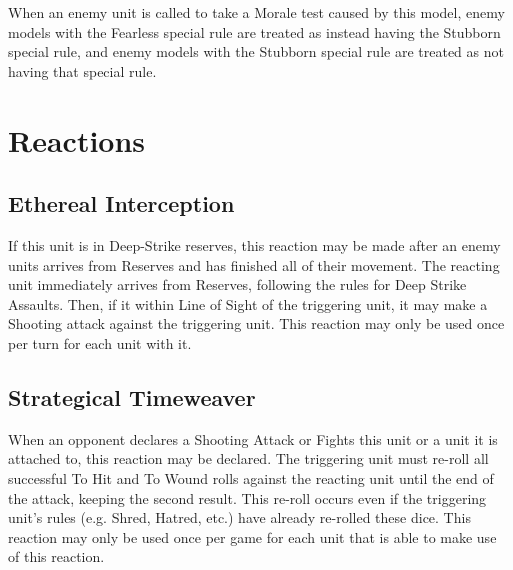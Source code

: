 When an enemy unit is called to take a Morale test caused by this model, enemy models with the Fearless special rule are treated as instead having the Stubborn special rule, and enemy models with the Stubborn special rule are treated as not having that special rule.

\section{Reactions}

\subsection{Ethereal Interception} \label{Ethereal Interception}

If this unit is in Deep-Strike reserves, this reaction may be made after an enemy units arrives from Reserves and has finished all of their movement. The reacting unit immediately arrives from Reserves, following the rules for Deep Strike Assaults. Then, if it within Line of Sight of the triggering unit, it may make a Shooting attack against the triggering unit. This reaction may only be used once per turn for each unit with it. \\

\subsection{Strategical Timeweaver} \label{Strategical Timeweaver}

When an opponent declares a Shooting Attack or Fights this unit or a unit it is attached to, this reaction may be declared. The triggering unit must re-roll all successful To Hit and To Wound rolls against the reacting unit until the end of the attack, keeping the second result. This re-roll occurs even if the triggering unit's rules (e.g. Shred, Hatred, etc.) have already re-rolled these dice. This reaction may only be used once per game for each unit that is able to make use of this reaction.

